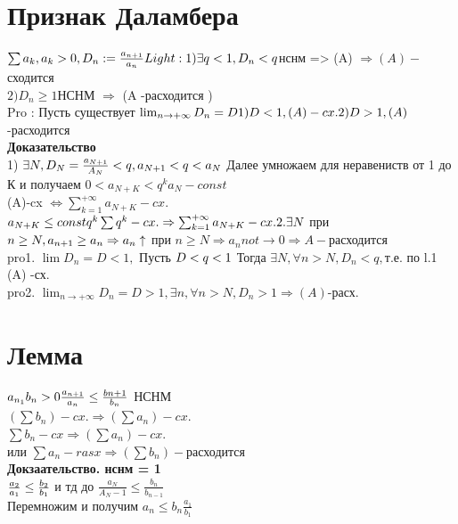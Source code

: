 \documentclass[12pt, a4paper]{article}
\begin{document}
	\section{Признак Даламбера}
	$ \sum a_k , a_k > 0, D_n := \frac{a_{n+1}}{a_n}\\
	Light: 1) \exists q<1, D_n < q  $нснм => (A) $  \Rightarrow (A)- $сходится \\
	$ 2) D_n \geq 1  $НСНМ $\Rightarrow$ (A -расходится )\\
	Pro : Пусть существует $ \lim_{n \rightarrow +\infty} D_n =D \\
	1)  D < 1 , (A) -cx. \\
	2) D >1 , (A) $-расходится \\
	\textbf{Доказательство} \\
	1) $ \exists N, D_N =\frac{a_{N+1}}{A_N} < q,
	\\ a_{N+1} < q< a_N $ Далее умножаем  для неравениств от 1 до К и получаем $0<a_{N+K} < q^k  a_N - const$\\
	(A)-cx $ \Leftrightarrow \sum_{k=1}^{+\infty} a_{N+K}- cx. $\\
	$ a_{N+K} \leq const q^k \\
	\sum q^k -cx. \Rightarrow \sum_{k=1}^{+\infty} a_{N+K}- cx. \\
	2. \exists N  $ при $ n \geq N, a_{n+1} \geq a_n \\
	\Rightarrow a_n \uparrow $ при $ n \geq N \Rightarrow a_n  not \rightarrow 0 \Rightarrow A- $расходится \\
	
	pro1. $ \lim D_n= D < 1 , $ Пусть $ D< q < 1 \\ $
	Тогда $ \exists N, \forall n > N , D_n < q,  $т.е. по l.1  (A) -сх. \\
	pro2. $ \lim_{n \rightarrow +\infty}D_n =D > 1,  \exists n , \forall n  > N, D_n > 1 \Rightarrow(A) $-расх.\\
	
	\section{Лемма}
	$ a_{n_1} b_n>0 \\
	\frac{a_{n+1}}{a_n} \leq \frac{b{n+1}}{b_n}$ НСНМ \\
	$ (\sum b_n) -cx. \Rightarrow (\sum a_n )- cx. $\\
	
	$ \sum b_n -cx \Rightarrow (\sum a_n)-cx.$\\
	или
	$ \sum a_n -rasx \Rightarrow (\sum b_n)-$расходится\\
	\textbf{Докзаательство. нснм = 1}\\
	$ \frac{a_2}{a_1} \leq \frac{b_2}{b_1}\\$ и тд до $ \frac{a_N}{A_N-1} \leq \frac{b_n}{b_{n-1}}$ \\ Перемножим и получим $a_n \leq b_n \frac{a_1}{b_1}$\\
\end{document}
